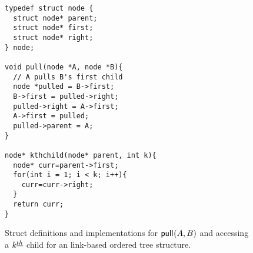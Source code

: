 \begin{figure}[H]
	\begin{center}

	    \begin{Verbatim}
typedef struct node {
  struct node* parent;
  struct node* first;
  struct node* right;
} node;

void pull(node *A, node *B){ 
  // A pulls B's first child
  node *pulled = B->first;
  B->first = pulled->right;
  pulled->right = A->first;
  A->first = pulled;
  pulled->parent = A;
}

node* kthchild(node* parent, int k){
  node* curr=parent->first;
  for(int i = 1; i < k; i++){
    curr=curr->right;
  }
  return curr;
}
\end{Verbatim}

    \cprotect\caption{Struct definitions and implementations for $\mathsf{pull}_{}(A,B)$ and accessing a $k^{\underline{th}}$ child for an link-based ordered tree structure.}
\label{fig:otreestarter-link}
	\end{center}
\end{figure}


